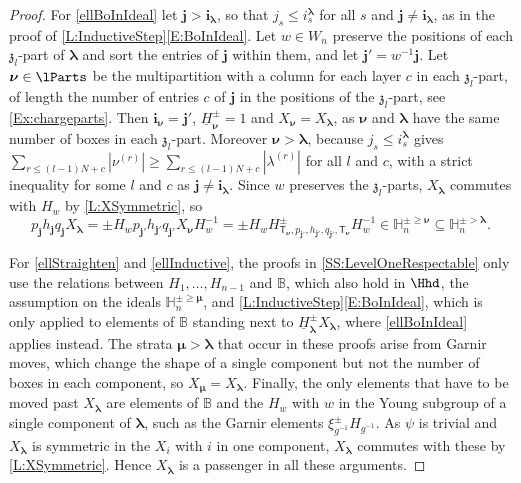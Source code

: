 \documentclass[a4paper,11pt]{amsart}
\newcommand\blam{{\boldsymbol\lambda}}
\newcommand\bmu{{\boldsymbol\mu}}
\newcommand\bnu{{\boldsymbol\nu}}
\newcommand\bi{\mathbf{i}}
\newcommand\bj{\mathbf{j}}
\newcommand\ilam[1][\blam]{\bi_{#1}}
\numberwithin{equation}{subsection}
\theoremstyle{definition}
\theoremstyle{theorem}
\theoremstyle{remark}
\newcommand\kapp{{\mathfrak{z}}}
\newcommand\HH{\mathbb{H}}
\newcommand\HJpm{\underline{H}^\pm}
\newcommand\Sym{W}
\newcommand\xipm{\xi^\pm}
\newcommand\Tlam[1][\blam]{{\mathsf{T}_{#1}}}
\newcommand{\Bo}{\mathbb{B}}
\begin{document}
\begin{proof}
  For \autoref{ellBoInIdeal} let $\bj>\ilam$, so that $j_s\le i^\blam_s$ for all $s$ and $\bj\ne\ilam$, as in the proof of \autoref{L:InductiveStep}\autoref{E:BoInIdeal}. Let $w\in\Sym_n$ preserve the positions of each $\kapp_l$-part of $\blam$ and sort the entries of $\bj$ within them, and let $\bj'=w^{-1}\bj$. Let $\bnu\in\lParts$ be the multipartition with a column for each layer $c$ in each $\kapp_l$-part, of length the number of entries $c$ of $\bj$ in the positions of the $\kapp_l$-part, see \autoref{Ex:chargeparts}. Then $\ilam[\bnu]=\bj'$, $\HJpm_\bnu=1$ and $X_\bnu=X_\blam$, as $\bnu$ and $\blam$ have the same number of boxes in each $\kapp_l$-part. Moreover $\bnu>\blam$, because $j_s\le i^\blam_s$ gives $\sum_{r\le(l-1)N+c}|\nu^{(r)}|\ge\sum_{r\le(l-1)N+c}|\lambda^{(r)}|$ for all $l$ and $c$, with a strict inequality for some $l$ and $c$ as $\bj\ne\ilam$. Since $w$ preserves the $\kapp_l$-parts, $X_\blam$ commutes with $H_w$ by \autoref{L:XSymmetric}, so
  \[
    p_\bj h_\bj q_\bj X_\blam=\pm H_wp_{\bj'}h_{\bj'}q_{\bj'}X_\bnu H_w^{-1}
    =\pm H_wH^\pm_{\Tlam[\bnu],p_{\bj'},h_{\bj'},q_{\bj'},\Tlam[\bnu]}H_w^{-1}
    \in\HH^{\pm\ge\bnu}_n\subseteq\HH^{\pm>\blam}_n .
  \]

  For \autoref{ellStraighten} and \autoref{ellInductive}, the proofs in
  \autoref{SS:LevelOneRespectable} only use the relations between $H_1,\dots,H_{n-1}$ and
  $\Bo$, which also hold in $\Hhd$, the assumption on the ideals $\HH^{\pm\ge\bmu}_n$, and
  \autoref{L:InductiveStep}\autoref{E:BoInIdeal}, which is only applied to elements of $\Bo$
  standing next to $\HJpm_\blam X_\blam$, where \autoref{ellBoInIdeal} applies instead. The
  strata $\bmu>\blam$ that occur in these proofs arise from Garnir moves, which change the shape
  of a single component but not the number of boxes in each component, so $X_\bmu=X_\blam$.
  Finally, the only elements that have to be moved past $X_\blam$ are elements of $\Bo$ and the
  $H_w$ with $w$ in the Young subgroup of a single component of $\blam$, such as the Garnir
  elements $\xipm_{g^{-1}}H_{g^{-1}}$. As $\psi$ is trivial and $X_\blam$ is
  symmetric in the $X_i$ with $i$ in one component, $X_\blam$ commutes with these by
  \autoref{L:XSymmetric}. Hence $X_\blam$ is a passenger in all these arguments.
\end{proof}
\end{document}
